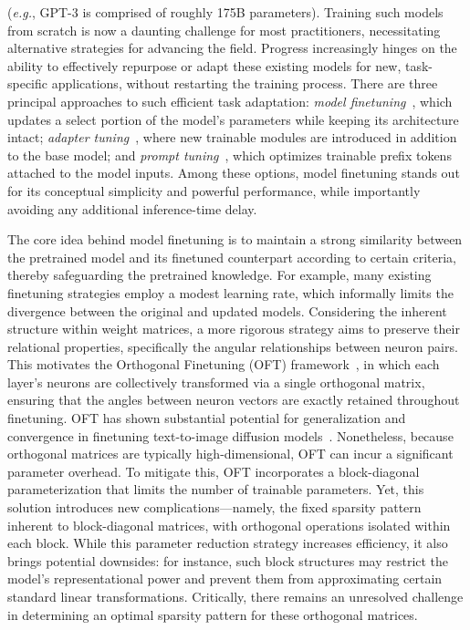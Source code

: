 (\emph{e.g.}, GPT-3 is comprised of roughly 175B parameters). Training such models from scratch is now a daunting challenge for most practitioners, necessitating alternative strategies for advancing the field. Progress increasingly hinges on the ability to effectively repurpose or adapt these existing models for new, task-specific applications, without restarting the training process. There are three principal approaches to such efficient task adaptation: \emph{model finetuning}~\cite{hulora2022,zaken2022bitfit,guo2020parameter,raffel2020exploring,qiu2023controlling,zhang2022adaptive,chavan2023one}, which updates a select portion of the model's parameters while keeping its architecture intact; \emph{adapter tuning}~\cite{rebuffi2017learning,houlsby2019parameter,pfeiffer2020adapterfusion,lin2020exploring,he2021towards}, where new trainable modules are introduced in addition to the base model; and \emph{prompt tuning}~\cite{li2021prefix,lester2021power}, which optimizes trainable prefix tokens attached to the model inputs. Among these options, model finetuning stands out for its conceptual simplicity and powerful performance, while importantly avoiding any additional inference-time delay.

The core idea behind model finetuning is to maintain a strong similarity between the pretrained model and its finetuned counterpart according to certain criteria, thereby safeguarding the pretrained knowledge. For example, many existing finetuning strategies employ a modest learning rate, which informally limits the divergence between the original and updated models. Considering the inherent structure within weight matrices, a more rigorous strategy aims to preserve their relational properties, specifically the angular relationships between neuron pairs. This motivates the Orthogonal Finetuning (OFT) framework~\cite{qiu2023controlling}, in which each layer’s neurons are collectively transformed via a single orthogonal matrix, ensuring that the angles between neuron vectors are exactly retained throughout finetuning. OFT has shown substantial potential for generalization and convergence in finetuning text-to-image diffusion models~\cite{qiu2023controlling}. Nonetheless, because orthogonal matrices are typically high-dimensional, OFT can incur a significant parameter overhead. To mitigate this, OFT incorporates a block-diagonal parameterization that limits the number of trainable parameters. Yet, this solution introduces new complications—namely, the fixed sparsity pattern inherent to block-diagonal matrices, with orthogonal operations isolated within each block. While this parameter reduction strategy increases efficiency, it also brings potential downsides: for instance, such block structures may restrict the model’s representational power and prevent them from approximating certain standard linear transformations. Critically, there remains an unresolved challenge in determining an optimal sparsity pattern for these orthogonal matrices.

